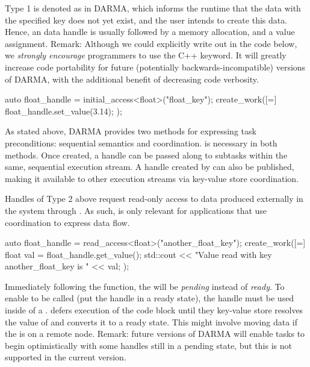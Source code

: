 Type 1 is denoted as  in DARMA, 
which informs the runtime that the data with the 
specified key does not yet exist, and the user intends to 
create this data.%
Hence, an  data handle is usually 
followed by a memory allocation, and a value assignment. 
Remark: Although we could explicitly write out  in the code below,
we \emph{strongly encourage} programmers to use the C++  keyword.
It will greatly increase code portability for future (potentially backwards-incompatible) versions of DARMA,
with the additional benefit of decreasing code verbosity.

\begin{CppCode}
auto float_handle = initial_access<float>("float_key");
create_work([=]{
  float_handle.set_value(3.14);
});
\end{CppCode}
As stated above, DARMA provides two methods for expressing task preconditions: sequential semantics and coordination.
 is necessary in both methods.
Once created, a handle can be passed along to subtasks within the same, sequential execution stream.
A handle created by  can also be published, making it available to other execution streams via key-value store coordination.


Handles of Type 2 above request read-only access to data produced externally in the system through . 
As such,  is only relevant for applications that use coordination to express data flow.
\begin{CppCode}
auto float_handle = read_access<float>("another_float_key");
create_work([=]{
  float val = float_handle.get_value();
  std::cout << "Value read with key another_float_key is " << val;  
});
\end{CppCode}
Immediately following the  function, the \ahandle will be \emph{pending} instead of \emph{ready}.
To enable  to be called (put the handle in a ready state), the handle must be used inside of a .
\cwork defers execution of the code block until they key-value store resolves the value of  and converts it to a ready state.
This might involve moving data if the  is on a remote node.
Remark: future versions of DARMA will enable tasks to begin optimistically with some handles still in a pending state, but this is not supported in the current version.
 

